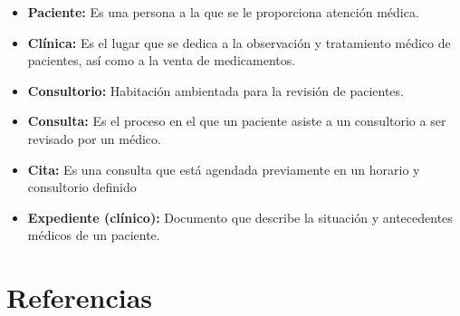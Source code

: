 \begin{itemize}
\item \textbf{Paciente: }Es una persona a la que se le proporciona atención médica.
\item \textbf{Clínica: }Es el lugar que se dedica a la observación y tratamiento médico de pacientes, así como a la venta de medicamentos.
\item \textbf{Consultorio: }Habitación ambientada para la revisión de pacientes.
\item \textbf{Consulta: }Es el proceso en el que un paciente asiste a un consultorio a ser revisado por un médico.
\item \textbf{Cita: }Es una consulta que está agendada previamente en un horario y consultorio definido
\item \textbf{Expediente (clínico): }Documento que describe la situación y antecedentes médicos de un paciente.
\end{itemize}
\section{Referencias}

